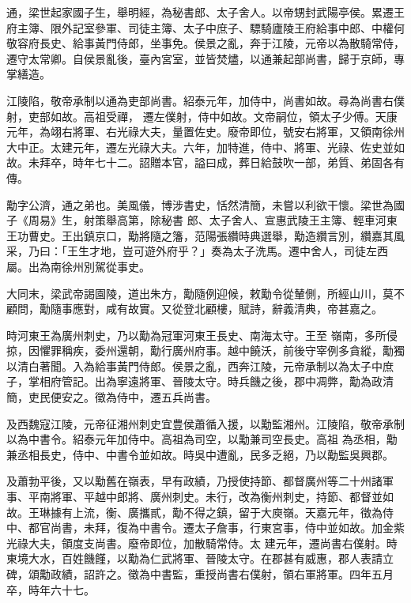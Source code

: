 \begin{pinyinscope}
 通，梁世起家國子生，舉明經，為秘書郎、太子舍人。以帝甥封武陽亭侯。累遷王府主簿、限外記室參軍、司徒主簿、太子中庶子、驃騎廬陵王府給事中郎、中權何敬容府長史、給事黃門侍郎，坐事免。侯景之亂，奔于江陵，元帝以為散騎常侍，遷守太常卿。自侯景亂後，臺內宮室，並皆焚燼，以通兼起部尚書，歸于京師，專掌繕造。



 江陵陷，敬帝承制以通為吏部尚書。紹泰元年，加侍中，尚書如故。尋為尚書右僕射，吏部如故。高祖受禪，
 遷左僕射，侍中如故。文帝嗣位，領太子少傅。天康元年，為翊右將軍、右光祿大夫，量置佐史。廢帝即位，號安右將軍，又領南徐州大中正。太建元年，遷左光祿大夫。六年，加特進，侍中、將軍、光祿、佐史並如故。未拜卒，時年七十二。詔贈本官，謚曰成，葬日給鼓吹一部，弟質、弟固各有傳。



 勱字公濟，通之弟也。美風儀，博涉書史，恬然清簡，未嘗以利欲干懷。梁世為國子《周易》生，射策舉高第，除秘書
 郎、太子舍人、宣惠武陵王主簿、輕車河東王功曹史。王出鎮京口，勱將隨之籓，范陽張纘時典選舉，勱造纘言別，纘嘉其風采，乃曰：「王生才地，豈可遊外府乎？」奏為太子洗馬。遷中舍人，司徒左西屬。出為南徐州別駕從事史。



 大同末，梁武帝謁園陵，道出朱方，勱隨例迎候，敕勱令從輦側，所經山川，莫不顧問，勱隨事應對，咸有故實。又從登北顧樓，賦詩，辭義清典，帝甚嘉之。



 時河東王為廣州刺史，乃以勱為冠軍河東王長史、南海太守。王至
 嶺南，多所侵掠，因懼罪稱疾，委州還朝，勱行廣州府事。越中饒沃，前後守宰例多貪縱，勱獨以清白著聞。入為給事黃門侍郎。侯景之亂，西奔江陵，元帝承制以為太子中庶子，掌相府管記。出為寧遠將軍、晉陵太守。時兵饑之後，郡中凋弊，勱為政清簡，吏民便安之。徵為侍中，遷五兵尚書。



 及西魏寇江陵，元帝征湘州刺史宜豊侯蕭循入援，以勱監湘州。江陵陷，敬帝承制以為中書令。紹泰元年加侍中。高祖為司空，以勱兼司空長史。高祖
 為丞相，勱兼丞相長史，侍中、中書令並如故。時吳中遭亂，民多乏絕，乃以勱監吳興郡。



 及蕭勃平後，又以勱舊在嶺表，早有政績，乃授使持節、都督廣州等二十州諸軍事、平南將軍、平越中郎將、廣州刺史。未行，改為衡州刺史，持節、都督並如故。王琳據有上流，衡、廣攜貳，勱不得之鎮，留于大庾嶺。天嘉元年，徵為侍中、都官尚書，未拜，復為中書令。遷太子詹事，行東宮事，侍中並如故。加金紫光祿大夫，領度支尚書。廢帝即位，加散騎常侍。太
 建元年，遷尚書右僕射。時東境大水，百姓饑饉，以勱為仁武將軍、晉陵太守。在郡甚有威惠，郡人表請立碑，頌勱政績，詔許之。徵為中書監，重授尚書右僕射，領右軍將軍。四年五月卒，時年六十七。




\end{pinyinscope}
